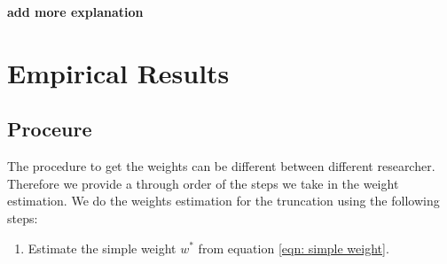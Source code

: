 \documentclass[]{article}
\providecommand{\tightlist}{%
  \setlength{\itemsep}{0pt}\setlength{\parskip}{0pt}}
\begin{document}
\textbf{add more explanation}

\hypertarget{empirical-results}{%
\section{Empirical Results}\label{empirical-results}}

\hypertarget{proceure}{%
\subsection{Proceure}\label{proceure}}

The procedure to get the weights can be different between different
researcher. Therefore we provide a through order of the steps we take in
the weight estimation. We do the weights estimation for the truncation
using the following steps:

\begin{enumerate}
\def\labelenumi{\arabic{enumi}.}
\tightlist
\item
  Estimate the simple weight \(w^*\) from equation
  \ref{eqn: simple weight}.
\end{enumerate}
\end{document}
